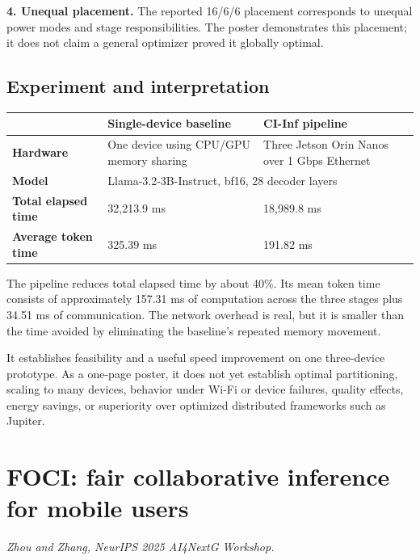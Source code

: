 \documentclass[10pt,a4paper]{article}
\begin{document}
\textbf{4. Unequal placement.} The reported 16/6/6 placement corresponds to unequal power modes and stage responsibilities. The poster demonstrates this placement; it does not claim a general optimizer proved it globally optimal.

\clearpage
\subsection{Experiment and interpretation}

\begin{center}
\begin{tabularx}{0.92\textwidth}{>{\bfseries}lXX}
\toprule
 & Single-device baseline & CI-Inf pipeline \\
\midrule
Hardware & One device using CPU/GPU memory sharing & Three Jetson Orin Nanos over 1 Gbps Ethernet \\
Model & \multicolumn{2}{l}{Llama-3.2-3B-Instruct, bf16, 28 decoder layers} \\
Total elapsed time & 32,213.9 ms & 18,989.8 ms \\
Average token time & 325.39 ms & 191.82 ms \\
\bottomrule
\end{tabularx}
\end{center}

The pipeline reduces total elapsed time by about 40\%. Its mean token time consists of approximately 157.31 ms of computation across the three stages plus 34.51 ms of communication. The network overhead is real, but it is smaller than the time avoided by eliminating the baseline's repeated memory movement.

\begin{cautionbox}
It establishes feasibility and a useful speed improvement on one three-device prototype. As a one-page poster, it does not yet establish optimal partitioning, scaling to many devices, behavior under Wi-Fi or device failures, quality effects, energy savings, or superiority over optimized distributed frameworks such as Jupiter.
\end{cautionbox}

\section{FOCI: fair collaborative inference for mobile users}

\textit{Zhou and Zhang, NeurIPS 2025 AI4NextG Workshop.}
\end{document}
